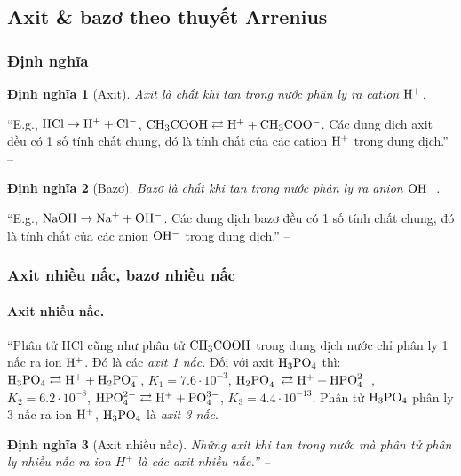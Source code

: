 \documentclass[oneside]{book}
\numberwithin{equation}{section}
\newtheorem{dinhnghia}{Định nghĩa}[section]
\begin{document}
\subsection{Axit \& bazơ theo thuyết Arrenius}

\subsubsection{Định nghĩa}

\begin{dinhnghia}[Axit]
	\emph{Axit} là chất khi tan trong nước phân ly ra cation $\rm H^+$.
\end{dinhnghia}
``E.g., $\rm HCl\to H^+ + Cl^-$, $\rm CH_3COOH\rightleftarrows H^+ + CH_3COO^-$. Các dung dịch axit đều có 1 số tính chất chung, đó là tính chất của các cation $\rm H^+$ trong dung dịch.'' -- \cite[p. 11]{SGK_Hoa_Hoc_11_nang_cao}

\begin{dinhnghia}[Bazơ]
	\emph{Bazơ} là chất khi tan trong nước phân ly ra anion $\rm OH^-$.
\end{dinhnghia}
``E.g., $\rm NaOH\to Na^+ + OH^-$. Các dung dịch bazơ đều có 1 số tính chất chung, đó là tính chất của các anion $\rm OH^-$ trong dung dịch.'' -- \cite[p. 11]{SGK_Hoa_Hoc_11_nang_cao}

\subsubsection{Axit nhiều nấc, bazơ nhiều nấc}

\paragraph{Axit nhiều nấc.} ``Phân tử HCl cũng như phân tử $\rm CH_3COOH$ trong dung dịch nước chỉ phân ly 1 nấc ra ion $\rm H^+$. Đó là các \textit{axit 1 nấc}. Đối với axit $\rm H_3PO_4$ thì: $\rm H_3PO_4\rightleftarrows H^+ + H_2PO_4^-$, $K_1 = 7.6\cdot 10^{-3}$, $\rm H_2PO_4^-\rightleftarrows H^+ + HPO_4^{2-}$, $K_2 = 6.2\cdot 10^{-8}$, $\rm HPO_4^{2-}\rightleftarrows H^+ + PO_4^{3-}$, $K_3 = 4.4\cdot 10^{-13}$. Phân tử $\rm H_3PO_4$ phân ly 3 nấc ra ion $\rm H^+$, $\rm H_3PO_4$ là \textit{axit 3 nấc}.

\begin{dinhnghia}[Axit nhiều nấc]
	Những axit khi tan trong nước mà phân tử phân ly nhiều nấc ra ion $H^+$ là các \emph{axit nhiều nấc}.'' -- \cite[p. 11]{SGK_Hoa_Hoc_11_nang_cao}
\end{dinhnghia}
\end{document}
